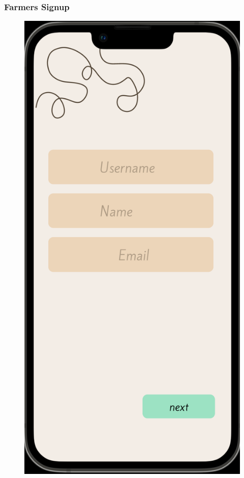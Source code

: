 \subsubsection{Farmers Signup}
    \begin{figure}[ht]
        \centering
        \includegraphics[width = 0.5\linewidth]{figures/signupFarmers.png}
        \label{fig:signup}
    \end{figure}
\clearpage

